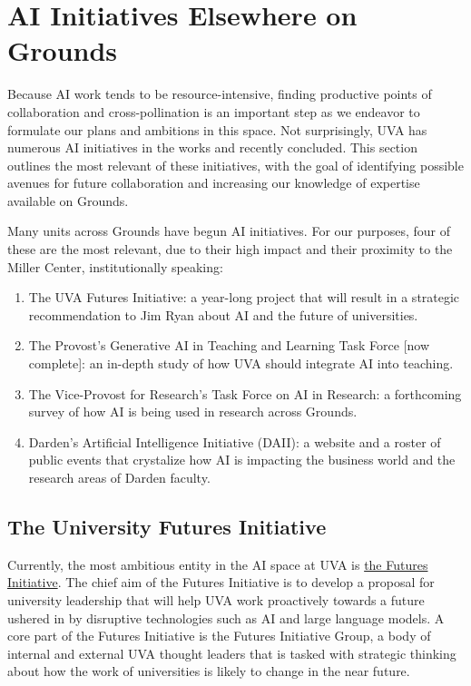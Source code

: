 \documentclass[12pt, oneside]{article}   	%
\begin{document}
\section{AI Initiatives Elsewhere on Grounds}\label{section.grounds}
Because AI work tends to be resource-intensive, finding productive points of collaboration and cross-pollination is an important step as we endeavor to formulate our plans and ambitions in this space.  Not surprisingly, UVA has numerous AI initiatives in the works and recently concluded.  This section outlines the most relevant  of these initiatives, with the goal of identifying possible avenues for future collaboration and increasing our knowledge of expertise available on Grounds.

Many units across Grounds have begun AI initiatives.  For our purposes, four of these are the most relevant, due to their high impact and their proximity to the Miller Center, institutionally speaking:
\begin{enumerate}
\item The UVA Futures Initiative: a year-long project that will result in a strategic recommendation to Jim Ryan about AI and the future of universities.
\item The Provost's Generative AI in Teaching and Learning Task Force [now complete]: an in-depth study of how UVA should integrate AI into teaching.
\item The Vice-Provost for Research's Task Force on AI in Research: a forthcoming survey of how AI is being used in research across Grounds.
\item Darden's Artificial Intelligence Initiative (DAII): a website and a roster of public events that crystalize how AI is impacting the business world and the research areas of Darden faculty. 
\end{enumerate}

\subsection{The University Futures Initiative}
Currently, the most ambitious entity in the AI space at UVA is \href{https://as.virginia.edu/uva-launches-futures-initiative-chart-next-decade-higher-ed}{the Futures Initiative}.  The chief aim of the Futures Initiative is to develop a proposal for university leadership that will help UVA work proactively towards a future ushered in by disruptive technologies such as AI and large language models.  A core part of the Futures Initiative is the Futures Initiative Group, a body of internal and external UVA thought leaders that is tasked with strategic thinking about how the work of universities is likely to change in the near future.  
\end{document}
